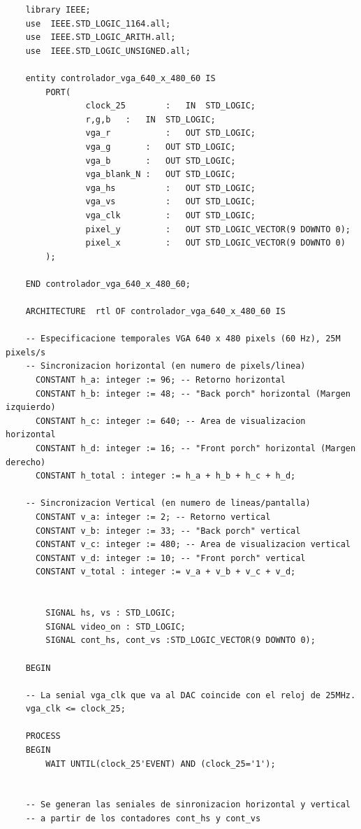 \begin{lstlisting}
    library IEEE;
    use  IEEE.STD_LOGIC_1164.all;
    use  IEEE.STD_LOGIC_ARITH.all;
    use  IEEE.STD_LOGIC_UNSIGNED.all;
    
    entity controlador_vga_640_x_480_60 IS
        PORT(	
                clock_25		: 	IN	STD_LOGIC;
                r,g,b	: 	IN	STD_LOGIC;
                vga_r			:	OUT	STD_LOGIC;
                vga_g		:	OUT	STD_LOGIC;
                vga_b		:	OUT	STD_LOGIC;
                vga_blank_N	:	OUT	STD_LOGIC;
                vga_hs			:	OUT STD_LOGIC;
                vga_vs			:	OUT STD_LOGIC;
                vga_clk			:	OUT STD_LOGIC;
                pixel_y			:	OUT STD_LOGIC_VECTOR(9 DOWNTO 0);
                pixel_x			:	OUT	STD_LOGIC_VECTOR(9 DOWNTO 0)
        );		
                
    END controlador_vga_640_x_480_60;
    
    ARCHITECTURE  rtl OF controlador_vga_640_x_480_60 IS
    
    -- Especificacione temporales VGA 640 x 480 pixels (60 Hz), 25M pixels/s
    -- Sincronizacion horizontal (en numero de pixels/linea)
      CONSTANT h_a: integer := 96; -- Retorno horizontal
      CONSTANT h_b: integer := 48; -- "Back porch" horizontal (Margen izquierdo)
      CONSTANT h_c: integer := 640; -- Area de visualizacion horizontal 
      CONSTANT h_d: integer := 16; -- "Front porch" horizontal (Margen derecho)  
      CONSTANT h_total : integer := h_a + h_b + h_c + h_d;  
       
    -- Sincronizacion Vertical (en numero de lineas/pantalla)  
      CONSTANT v_a: integer := 2; -- Retorno vertical
      CONSTANT v_b: integer := 33; -- "Back porch" vertical
      CONSTANT v_c: integer := 480; -- Area de visualizacion vertical 
      CONSTANT v_d: integer := 10; -- "Front porch" vertical 
      CONSTANT v_total : integer := v_a + v_b + v_c + v_d;  
     
        
        SIGNAL hs, vs : STD_LOGIC;
        SIGNAL video_on : STD_LOGIC;
        SIGNAL cont_hs, cont_vs :STD_LOGIC_VECTOR(9 DOWNTO 0);
    
    BEGIN
    
    -- La senial vga_clk que va al DAC coincide con el reloj de 25MHz. 
    vga_clk <= clock_25;
    
    PROCESS
    BEGIN
        WAIT UNTIL(clock_25'EVENT) AND (clock_25='1');
    
    
    -- Se generan las seniales de sinronizacion horizontal y vertical
    -- a partir de los contadores cont_hs y cont_vs
    

\end{lstlisting}
